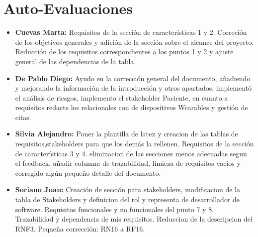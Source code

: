 \documentclass{article}
\begin{document}
\section{Auto-Evaluaciones}
\begin{itemize}
	\item \textbf{Cuevas Marta:} Requisitos de la sección de características 1 y 2. Correción de los objetivos generales y adición de la sección sobre el alcance del proyecto. Reducción de los requisitos correspondientes a los puntos 1 y 2 y ajuste general de las dependencias de la tabla.
	\item \textbf{De Pablo Diego:} Ayudo en la corrección general del documento, añadiendo y mejorando la información de la introducción y otros apartados, implementó el análisis de riesgos, implemento el stakeholder Paciente, en cuanto a requisitos  redacte los relacionales con de dispositivos Wearables y gestión de citas.
	\item \textbf{Silvia Alejandro:} Poner la plantilla de latex y creacion de las tablas de requisitos,stakeholders para que los demás la rellenen. Requisitos de la sección de características 3 y 4. eliminacion de las secciones menos adecuadas segun el feedback. añadir columna de trazabilidad, limieza de requisitos vacios y corregido algún pequeño detalle del documento.
	\item \textbf{Soriano Juan:} Creación de sección para stakeholders, modificacion de la tabla de Stakeholders y definicion del rol y representa de desarrollador de software. Requisitos funcionales y no funcionales del punto 7 y 8. Trazabilidad y dependencia de mis requisitos. Reduccion de la descripcion del RNF3. Pequeña corrección: RN16 a RF16.
\end{itemize}
\end{document}
